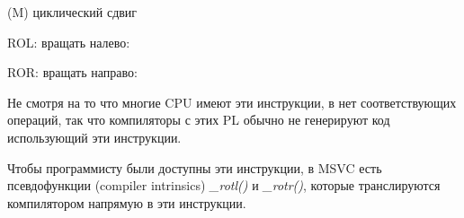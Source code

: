 \label{ROL_ROR}
\item[ROL/ROR] (M) циклический сдвиг
  
ROL: вращать налево:



ROR: вращать направо:



Не смотря на то что многие \ac{CPU} имеют эти инструкции, в \CCpp нет соответствующих операций,
так что компиляторы с этих \ac{PL} обычно не генерируют код использующий эти инструкции.

Чтобы программисту были доступны эти инструкции, в \ac{MSVC} есть псевдофункции
(compiler intrinsics)
\emph{\_rotl()} и \emph{\_rotr()}\FNMSDNROTxURL{},
которые транслируются компилятором напрямую в эти инструкции.

